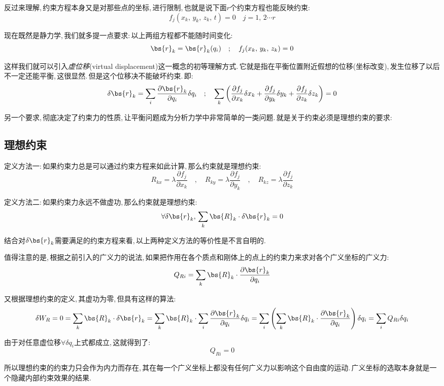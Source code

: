 反过来理解,\,约束方程本身又是对那些点的坐标,\,进行限制,\,也就是说下面$r$个约束方程也能反映约束:
\[f_j(x_k,\,y_k,\,z_k,\,t)=0\quad j=1,\,2\cdots r\]

现在既然是静力学,\,我们就多提一点要求:\,以上两组方程都不能随时间变化:
\[\bs{r}_k=\bs{r}_k(q_i)\quad;\quad f_j(x_k,\,y_k,\,z_k)=0\]

这样我们就可以引入\emph{虚位移}(virtual displacement)这一概念的初等理解方式.\,它就是指在平衡位置附近假想的位移(坐标改变),\,发生位移了以后不一定还能平衡,\,这很显然.\,但是这个位移决不能破坏约束.\,即:
\[\delta \bs{r}_k=\sum_i \frac{\partial \bs{r}_k}{\partial q_i}\delta q_i \quad;\quad \sum_k\left(\frac{\partial f_j}{\partial x_k}\delta x_k+\frac{\partial f_j}{\partial y_k}\delta y_k+\frac{\partial f_j}{\partial z_k}\delta z_k\right)=0\]

另一个要求,\,彻底决定了约束力的性质,\,让平衡问题成为分析力学中非常简单的一类问题.\,就是关于约束必须是理想约束的要求:

\subsection{理想约束}

定义方法一:\,如果约束力总是可以通过约束方程来如此计算,\,那么约束就是理想约束:
\[R_{kx}=\lambda \frac{\partial f_j}{\partial x_k}\quad,\quad R_{ky}=\lambda \frac{\partial f_j}{\partial y_k}\quad,\quad R_{kz}=\lambda \frac{\partial f_j}{\partial z_k}\]

定义方法二:\,如果约束力永远不做虚功,\,那么约束就是理想约束:
\[\forall \delta \bs{r}_k,\,\sum_k \bs{R}_k\cdot \delta \bs{r}_k=0\]

结合对$\delta \bs{r}_k$需要满足的约束方程来看,\,以上两种定义方法的等价性是不言自明的.

值得注意的是,\,根据之前引入的广义力的说法,\,如果把作用在各个质点和刚体上的点上的约束力来求对各个广义坐标的广义力:
\[Q_{Ri}=\sum_k \bs{R}_k\cdot \frac{\partial \bs{r}_k}{\partial q_i}\]

又根据理想约束的定义,\,其虚功为零,\,但具有这样的算法:
\[\delta W_R=0=\sum_k \bs{R}_k\cdot \delta \bs{r}_k=\sum_k \bs{R}_k\cdot \sum_i \frac{\partial \bs{r}_k}{\partial q_i}\delta q_i=\sum_i\left(\sum_k \bs{R}_k\cdot \frac{\partial \bs{r}_k}{\partial q_i}\right)\delta q_i=\sum_i Q_{Ri}\delta q_i\]

由于对任意虚位移$\forall\delta q_i$上式都成立,\,这就得到了:
\[Q_{Ri}=0\]

所以理想约束的约束力只会作为内力而存在,\,其在每一个广义坐标上都没有任何广义力以影响这个自由度的运动.\,广义坐标的选取本身就是一个隐藏内部约束效果的结果.



